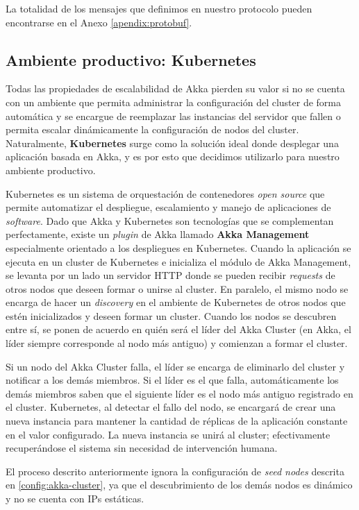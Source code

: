 La totalidad de los mensajes que definimos en nuestro protocolo pueden encontrarse en el Anexo \ref{apendix:protobuf}.

\subsection{Ambiente productivo: Kubernetes}
\label{sec:kubernetes}

\noindent Todas las propiedades de escalabilidad de Akka pierden su valor si no se cuenta con un ambiente que permita administrar la configuración del cluster
de forma automática y se encargue de reemplazar las instancias del servidor que fallen o permita escalar dinámicamente la configuración de nodos del cluster.
Naturalmente, \textbf{Kubernetes} surge como la solución ideal donde desplegar una aplicación basada en Akka, y es por esto que decidimos utilizarlo para nuestro ambiente productivo.

Kubernetes es un sistema de orquestación de contenedores \textit{open source} que permite automatizar el despliegue, escalamiento y manejo de aplicaciones de \textit{software}.
Dado que Akka y Kubernetes son tecnologías que se complementan perfectamente, existe un \textit{plugin} de Akka llamado \textbf{Akka Management} especialmente orientado a los despliegues
en Kubernetes. Cuando la aplicación se ejecuta en un cluster de Kubernetes e inicializa el módulo de Akka Management, se levanta por un lado un servidor HTTP donde se pueden recibir \textit{requests}
de otros nodos que deseen formar o unirse al cluster. En paralelo, el mismo nodo se encarga de hacer un \textit{discovery} en el ambiente de Kubernetes de otros nodos que estén inicializados y deseen formar
un cluster. Cuando los nodos se descubren entre sí, se ponen de acuerdo en quién será el líder del Akka Cluster (en Akka, el líder siempre corresponde al nodo más antiguo) y comienzan a formar el cluster.

Si un nodo del Akka Cluster falla, el líder se encarga de eliminarlo del cluster y notificar a los demás miembros. Si el líder es el que falla, automáticamente los demás miembros saben que el siguiente líder
es el nodo más antiguo registrado en el cluster. Kubernetes, al detectar el fallo del nodo, se encargará de crear una nueva instancia para mantener la cantidad de réplicas de la aplicación constante en el valor
configurado. La nueva instancia se unirá al cluster; efectivamente recuperándose el sistema sin necesidad de intervención humana.

El proceso descrito anteriormente ignora la configuración de \textit{seed nodes} descrita en \ref{config:akka-cluster}, ya que el descubrimiento de los demás nodos es dinámico y no se cuenta
con IPs estáticas.


